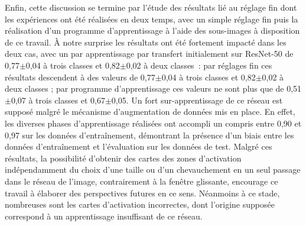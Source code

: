 Enfin, cette discussion se termine par l'étude des résultats lié au réglage fin dont les expériences ont été réalisées en deux temps, avec un simple réglage fin puis la réalisation d'un programme d'apprentissage à l'aide des sous-images à disposition de ce travail. À notre surprise les résultats ont été fortement impacté dans les deux cas, avec un \fscore{} par apprentissage par transfert initialement sur ResNet-50 de 0,77$\pm$0,04 à trois classes et 0,82$\pm$0,02 à deux classes~: par réglages fin ces résultats descendent à des valeurs de 0,77$\pm$0,04 à trois classes et 0,82$\pm$0,02 à deux classes ; par programme d'apprentissage ces valeurs ne sont plus que de 0,51$\pm$0,07 à trois classes et 0,67$\pm$0,05. Un fort sur-apprentissage de ce réseau est supposé malgré le mécanisme d'augmentation de données mis en place. En effet, les diverses phases d'apprentissage réalisées ont accompli un \fscore{} compris entre 0,90 et 0,97 sur les données d'entraînement, démontrant la présence d'un biais entre les données d'entraînement et l'évaluation sur les données de test. Malgré ces résultats, la possibilité d'obtenir des cartes des zones d'activation indépendamment du choix d'une taille ou d'un chevauchement en un seul passage dans le réseau de l'image, contrairement à la fenêtre glissante, encourage ce travail à élaborer des perspectives futures en ce sens. Néanmoins à ce stade, nombreuses sont les cartes d'activation incorrectes, dont l'origine supposée correspond à un apprentissage insuffisant de ce réseau.\par